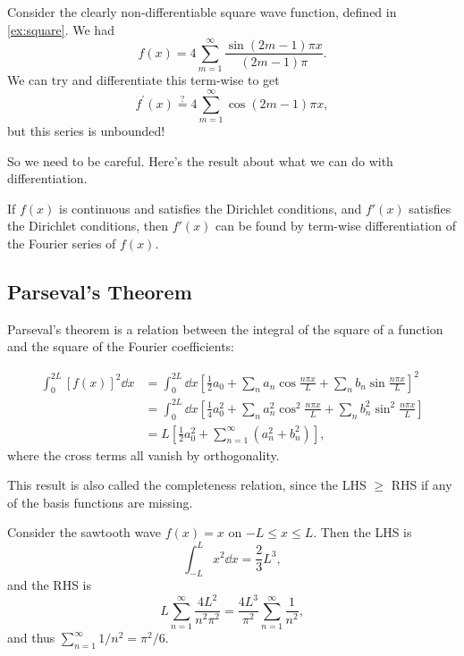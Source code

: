 \documentclass[a4paper]{scrartcl}
\begin{document}
\begin{example}
    Consider the clearly non-differentiable square wave function, defined in \autoref{ex:square}. We had
    $$
    f(x)=4 \sum_{m=1}^{\infty} \frac{\sin (2 m-1) \pi x}{(2 m-1) \pi}.
    $$
    We can try and differentiate this term-wise to get
    $$
    f^{\prime}(x) \stackrel{?}{=} 4 \sum_{m=1}^{\infty} \cos (2 m-1) \pi x,
    $$
    but this series is unbounded!
\end{example}

So we need to be careful. Here's the result about what we can do with differentiation.

\begin{theorem}
    If $f(x)$ is continuous and satisfies the Dirichlet conditions, and $f'(x)$ satisfies the Dirichlet conditions, then $f'(x)$ can be found by term-wise differentiation of the Fourier series of $f(x)$.
\end{theorem}

\subsection{Parseval's Theorem}

Parseval's theorem is a relation between the integral of the square of a function and the square of the Fourier coefficients:

\begin{align*}
    \int_{0}^{2L}[f(x)]^{2} \dd x&=\int_{0}^{2 L} \dd x\left[\frac{1}{2} a_{0}+\sum_{n} a_{n} \cos \frac{n \pi x}{L}+\sum_{n} b_{n} \sin \frac{n \pi x}{L}\right]^{2} \\
&= \int_{0}^{2 L} \dd x\left[\frac{1}{4} a_{0}^{2}+\sum_{n} a_{n}^{2} \cos ^{2} \frac{n \pi x}{L}+\sum_{n} b_{n}^{2} \sin ^{2} \frac{n \pi x}{L}\right] \\
&= L\left[\frac{1}{2} a_{0}^{2}+\sum_{n=1}^{\infty}\left(a_{n}^{2}+b_{n}^{2}\right)\right],
\end{align*}
where the cross terms all vanish by orthogonality.

This result is also called the completeness relation, since the LHS $\geq$ RHS if any of the basis functions are missing.

\begin{example}
    Consider the sawtooth wave $f(x) = x$ on $-L \leq x \leq L$. Then the LHS is
    $$
    \int_{-L}^{L} x^2 \dd x = \frac{2}{3}L^3,
    $$
    and the RHS is
    $$
    L \sum_{n = 1}^{\infty} \frac{4L^2}{n^2 \pi^2} = \frac{4L^3}{\pi^2}\sum_{n = 1}^{\infty} \frac{1}{n^2},
    $$
    and thus $\sum_{n = 1}^{\infty} 1/n^2 = \pi^2/6$.
\end{example}
\end{document}
